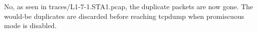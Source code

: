 No, as seen in traces/L1-7-1.STA1.pcap, the duplicate packets are now gone. The would-be duplicates are discarded before reaching tcpdump when promiscuous mode is disabled.
